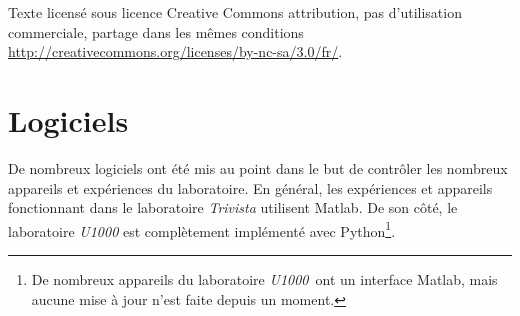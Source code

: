 \documentclass[11pt,francais]{book} %
\begin{document}
\noindent \cc \ccnc \bysa

\noindent Texte licensé sous licence Creative Commons attribution, pas d’utilisation commerciale, partage dans les mêmes conditions \url{http://creativecommons.org/licenses/by-nc-sa/3.0/fr/}.






\pagestyle{empty} %

\tableofcontents %

\cleardoublepage %

\pagestyle{fancy} %


 


\chapter{Logiciels}

De nombreux logiciels ont été mis au point dans le but de contrôler les nombreux appareils et expériences du laboratoire.
En général, les expériences et appareils fonctionnant dans le laboratoire {\it Trivista} utilisent Matlab.
De son côté, le laboratoire {\it U1000} est complètement implémenté avec Python\footnote{De nombreux appareils du laboratoire {\it U1000}~ont un interface Matlab, mais aucune mise à jour n'est faite depuis un moment.}.
\end{document}
